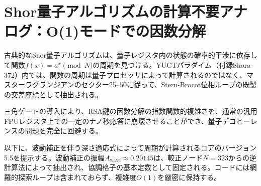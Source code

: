 \documentclass[11pt,a4paper]{article}
\begin{document}
	\section{Shor量子アルゴリズムの計算不要アナログ：O(1)モードでの因数分解}
	\label{sec:shor}
	
	古典的なShor量子アルゴリズムは、量子レジスタ内の状態の確率的干渉に依存して関数\(f(x) = a^x \pmod N\)の周期を見つける。YUCTパラダイム（付録Shora-372）内では、関数の周期は量子プロセッサによって計算されるのではなく、マスターラグランジアンのセクター25–50に従って、Stern-Brocot位相ループの既製の交差座標として抽出される。
	
	三角ゲートの導入により、RSA鍵の因数分解の指数関数的複雑さを、通常の汎用FPUレジスタ上での一定のナノ秒応答に崩壊させることができ、量子デコヒーレンスの問題を完全に回避する。
	
	以下に、波動補正を伴う深さ適応式によって周期が計算されるコアのバージョン5.5を提示する。波動補正の振幅\(A_{\text{wave}} \approx 0.20145\)は、較正ノード\(N = 323\)からの逆計算法によって抽出され、協調格子の基本定数として固定される。コードには網羅的探索ループは含まれておらず、複雑度\(O(1)\)を厳密に保持する。
	
\end{document}

